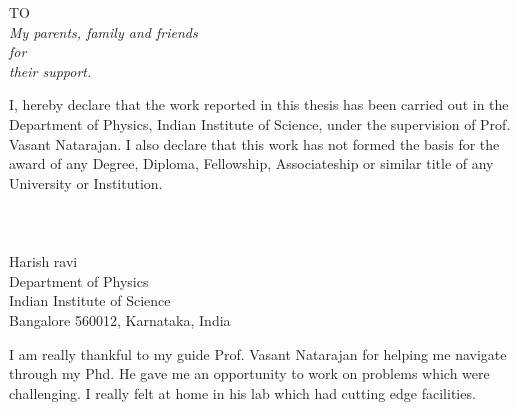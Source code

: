 \begin{frontmatter}
\iisclogotrue %
\maketitle
\begin{dedication}
\begin{center}
TO \\[2em]
\large\it My parents, family and friends\\
for\\
\large\it their support.
\end{center}
\end{dedication}
I, hereby declare that the work reported in this thesis has been carried out in the Department of Physics, Indian Institute of Science, under the supervision of Prof. Vasant Natarajan. I also declare that this work has not formed the basis for the award of any Degree, Diploma, Fellowship, Associateship or similar title of any University or Institution.
 \\
 \\
 \\
 \\
Harish ravi\\
Department of Physics\\
Indian Institute of Science\\
Bangalore 560012, Karnataka, India


\acknowledgements

I am really thankful to my guide Prof. Vasant Natarajan for helping me navigate through my Phd. He gave me an opportunity to work on problems which were challenging. I really felt at home in his lab which had cutting edge facilities. 


\end{frontmatter}
